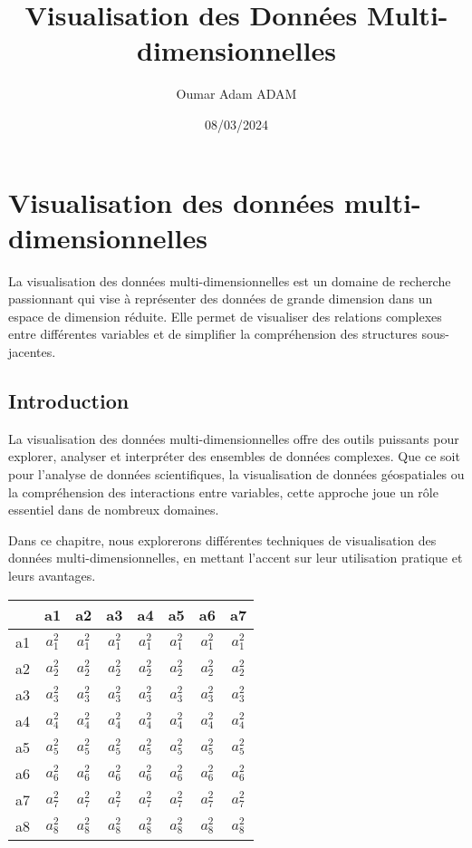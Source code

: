 \documentclass{article}
\title{Visualisation des Données Multi-dimensionnelles}
\author{Oumar Adam ADAM}
\date{08/03/2024}
\begin{document}
\maketitle

\section{Visualisation des données multi-dimensionnelles}
\label{sec:visualisation_des_donnees_multi_dimensionnelles}

La visualisation des données multi-dimensionnelles est un domaine de recherche passionnant qui vise à représenter des données de grande dimension dans un espace de dimension réduite. Elle permet de visualiser des relations complexes entre différentes variables et de simplifier la compréhension des structures sous-jacentes.

\subsection{Introduction}
\label{subsec:introduction}

La visualisation des données multi-dimensionnelles offre des outils puissants pour explorer, analyser et interpréter des ensembles de données complexes. Que ce soit pour l'analyse de données scientifiques, la visualisation de données géospatiales ou la compréhension des interactions entre variables, cette approche joue un rôle essentiel dans de nombreux domaines.

Dans ce chapitre, nous explorerons différentes techniques de visualisation des données multi-dimensionnelles, en mettant l'accent sur leur utilisation pratique et leurs avantages.




\begin{tabular}{|c|c|c|c|c|c|c|c|}
\hline
    & a1 & a2 & a3 & a4 & a5 & a6 & a7 \\
\hline
a1 & $a_1^2$ & $a_1^2$ & $a_1^2$ & $a_1^2$ & $a_1^2$ & $a_1^2$ & $a_1^2$ \\
\hline
a2 & $a_2^2$ & $a_2^2$ & $a_2^2$ & $a_2^2$ & $a_2^2$ & $a_2^2$ & $a_2^2$ \\
\hline
a3 & $a_3^2$ & $a_3^2$ & $a_3^2$ & $a_3^2$ & $a_3^2$ & $a_3^2$ & $a_3^2$ \\
\hline
a4 & $a_4^2$ & $a_4^2$ & $a_4^2$ & $a_4^2$ & $a_4^2$ & $a_4^2$ & $a_4^2$ \\
\hline
a5 & $a_5^2$ & $a_5^2$ & $a_5^2$ & $a_5^2$ & $a_5^2$ & $a_5^2$ & $a_5^2$ \\
\hline
a6 & $a_6^2$ & $a_6^2$ & $a_6^2$ & $a_6^2$ & $a_6^2$ & $a_6^2$ & $a_6^2$ \\
\hline
a7 & $a_7^2$ & $a_7^2$ & $a_7^2$ & $a_7^2$ & $a_7^2$ & $a_7^2$ & $a_7^2$ \\
\hline
a8 & $a_8^2$ & $a_8^2$ & $a_8^2$ & $a_8^2$ & $a_8^2$ & $a_8^2$ & $a_8^2$ \\
\hline
\end{tabular}
        

\end{document}
